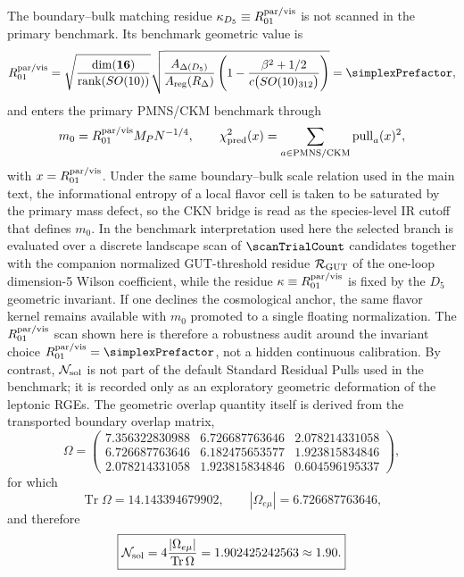 \documentclass[11pt]{article}
\newcommand{\Tr}{\operatorname{Tr}}
\newcommand{\Nsol}{\mathcal N_{\rm sol}}
\begin{document}
The boundary--bulk matching residue $\kappa_{D_5}\equiv R_{01}^{\rm par/vis}$ is not scanned in the primary benchmark. Its benchmark geometric value is
\begin{equation}
 R_{01}^{\rm par/vis}
 =
 \sqrt{\frac{\dim(\mathbf{16})}{\operatorname{rank}(SO(10))}}
 \sqrt{\frac{A_{\Delta(D_5)}}{A_{\rm reg}(R_{\Delta})}
 \left(1-\frac{\beta^2+1/2}{c\bigl(SO(10)_{312}\bigr)}\right)}
 =\simplexPrefactor,
\end{equation}
and enters the primary PMNS/CKM benchmark through
\begin{equation}
 m_0 = R_{01}^{\rm par/vis} M_PN^{-1/4},
 \qquad
 \chi^2_{\rm pred}(x)=\sum_{a\in\mathrm{PMNS/CKM}} \mathrm{pull}_a(x)^2,
\end{equation}
with $x=R_{01}^{\rm par/vis}$. Under the same boundary--bulk scale relation used in the main text, the informational entropy of a local flavor cell is taken to be saturated by the primary mass defect, so the CKN bridge is read as the species-level IR cutoff that defines $m_0$. In the benchmark interpretation used here the selected branch is evaluated over a discrete landscape scan of $\scanTrialCount$ candidates together with the companion normalized GUT-threshold residue $\mathcal R_{\rm GUT}$ of the one-loop dimension-5 Wilson coefficient, while the residue $\kappa\equiv R_{01}^{\rm par/vis}$ is fixed by the $D_5$ geometric invariant. If one declines the cosmological anchor, the same flavor kernel remains available with $m_0$ promoted to a single floating normalization. The $R_{01}^{\rm par/vis}$ scan shown here is therefore a robustness audit around the invariant choice $R_{01}^{\rm par/vis}=\simplexPrefactor$, not a hidden continuous calibration. By contrast, $\Nsol$ is not part of the default Standard Residual Pulls used in the benchmark; it is recorded only as an exploratory geometric deformation of the leptonic RGEs. The geometric overlap quantity itself is derived from the transported boundary overlap matrix,
\begin{equation}
 \Omega
 =
 \begin{pmatrix}
 7.356322830988 & 6.726687763646 & 2.078214331058 \\
 6.726687763646 & 6.182475653577 & 1.923815834846 \\
 2.078214331058 & 1.923815834846 & 0.604596195337
 \end{pmatrix},
\end{equation}
for which
\begin{equation}
 \Tr\Omega = 14.143394679902,
 \qquad
 |\Omega_{e\mu}| = 6.726687763646,
\end{equation}
and therefore
\begin{equation}
 \boxed{\Nsol = 4\frac{|\Omega_{e\mu}|}{\Tr\Omega}=1.902425242563\approx1.90.}
\end{equation}
\end{document}
